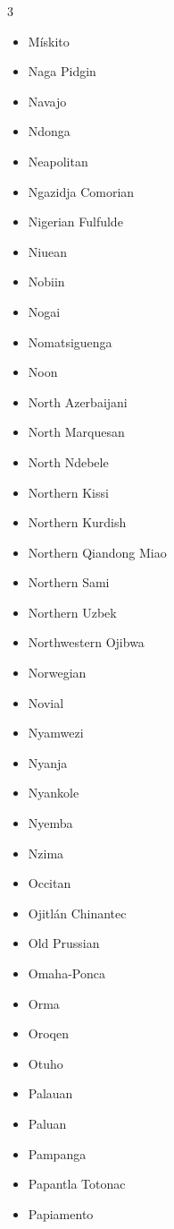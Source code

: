\documentclass[paper=a4, 10pt]{scrbook}
\begin{document}
\begin{multicols}{3}
\begin{itemize}
        \item Mískito
        \item Naga Pidgin
        \item Navajo
        \item Ndonga
        \item Neapolitan
        \item Ngazidja Comorian
        \item Nigerian Fulfulde
        \item Niuean
        \item Nobiin
        \item Nogai
        \item Nomatsiguenga
        \item Noon
        \item North Azerbaijani
        \item North Marquesan
        \item North Ndebele
        \item Northern Kissi
        \item Northern Kurdish
        \item Northern Qiandong Miao
        \item Northern Sami
        \item Northern Uzbek
        \item Northwestern Ojibwa
        \item Norwegian
        \item Novial
        \item Nyamwezi
        \item Nyanja
        \item Nyankole
        \item Nyemba
        \item Nzima
        \item Occitan
        \item Ojitlán Chinantec
        \item Old Prussian
        \item Omaha-Ponca
        \item Orma
        \item Oroqen
        \item Otuho
        \item Palauan
        \item Paluan
        \item Pampanga
        \item Papantla Totonac
        \item Papiamento

\end{itemize}
\end{multicols}
\end{document}
